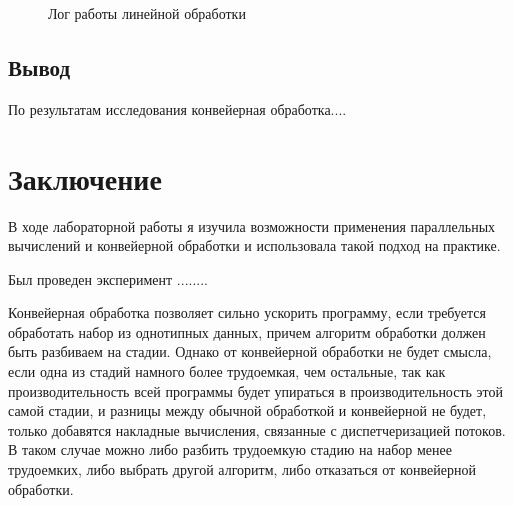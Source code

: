 \documentclass[12pt]{report}
\begin{document}
\begin{figure}[h]
	\caption{Лог работы линейной обработки}
	\label{fig:v_st}
\end{figure}




\section{Вывод}
По результатам исследования конвейерная обработка....

\chapter*{Заключение}
В ходе лабораторной работы я изучила возможности применения параллельных вычислений и конвейерной обработки и использовала такой подход на практике. 

Был проведен эксперимент ........

Конвейерная обработка позволяет сильно ускорить программу, если требуется обработать набор из однотипных данных, причем алгоритм обработки должен быть разбиваем на стадии. Однако от конвейерной обработки не будет смысла, если одна из стадий намного более трудоемкая, чем остальные, так как производительность всей программы будет упираться в производительность этой самой стадии, и разницы между обычной обработкой и конвейерной не будет, только добавятся накладные вычисления, связанные с диспетчеризацией потоков. В таком случае можно либо разбить трудоемкую стадию на набор менее трудоемких, либо выбрать другой алгоритм, либо отказаться от конвейерной обработки.
\end{document}
